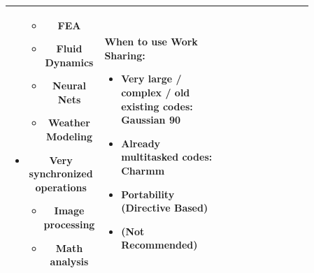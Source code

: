 \documentclass[12pt, a4paper]{book}
\begin{document}
\begin{longtable}{|c|p{0.43\linewidth}|p{0.43\linewidth}|}
\begin{itemize}
                                                         \begin{itemize}
                  \item FEA
                  \item Fluid Dynamics
                  \item Neural Nets
                  \item Weather Modeling
              \end{itemize}
                                                   \item Very synchronized operations
                                                         \begin{itemize}
                  \item Image processing
                  \item Math analysis
              \end{itemize}
                                               \end{itemize}                                                       & When to use Work Sharing: \begin{itemize}
                                                                                                                                                   \item Very large / complex / old existing codes: Gaussian 90
                                                                                                                                                   \item Already multitasked codes: Charmm
                                                                                                                                                   \item Portability (Directive Based)
                                                                                                                                                   \item (Not Recommended)
                                                                                                                                               \end{itemize}                   \\
    \hline
\end{longtable}
\end{document}
